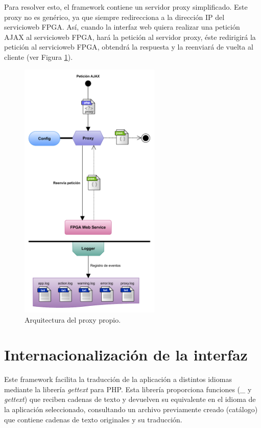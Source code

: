 Para resolver esto, el \gls{framework} contiene un servidor \gls{proxy} simplificado. Este \gls{proxy} no es genérico, ya que siempre redirecciona a la dirección IP del \gls{servicioweb} \gls{FPGA}. Así, cuando la interfaz web quiera realizar una petición \gls{AJAX} al \gls{servicioweb} \gls{FPGA}, hará la petición al servidor \gls{proxy}, éste redirigirá la petición al \gls{servicioweb} \gls{FPGA}, obtendrá la respuesta y la reenviará de vuelta al cliente (ver Figura \ref{fig:proxy}).

\begin{figure}[!htp]
  \centering
  \includegraphics[width=0.6\textwidth,clip=true]{graphics/proxy}
  \caption{Arquitectura del proxy propio.}
  \label{fig:proxy}
\end{figure}

\section{Internacionalización de la interfaz\label{extra:mvc:i18n}}

Este \gls{framework} facilita la traducción de la aplicación a distintos idiomas mediante la librería \textit{gettext} \cite{gettext} para \gls{PHP}. Esta librería proporciona funciones (\textit{\_} y \textit{gettext}) que reciben cadenas de texto y devuelven su equivalente en el idioma de la aplicación seleccionado, consultando un archivo previamente creado (catálogo) que contiene cadenas de texto originales y su traducción.

